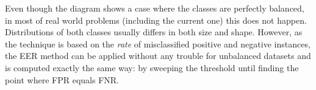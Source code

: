 Even though the diagram shows a case where the classes are perfectly balanced, in most of
real world problems (including the current one) this does not happen. Distributions of both
classes usually differs in both size and shape. However,
as the technique is based on the \textit{rate} of misclassified positive and negative instances,
the EER method can be applied without any trouble for unbalanced datasets and
is computed exactly the same way: by sweeping the threshold until finding the point
where FPR equals FNR.








